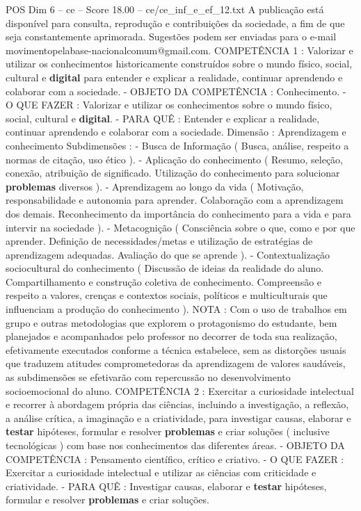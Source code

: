 \begin{textsample}{POS Dim 6 – ce – Score 18.00 – ce/ce\_inf\_e\_ef\_12.txt}
A publicação está disponível para consulta, reprodução e contribuições da sociedade, a fim de que seja constantemente aprimorada.
Sugestões podem ser enviadas para o e-mail movimentopelabase-nacionalcomum@gmail.com.
COMPETÊNCIA 1 : Valorizar e utilizar os conhecimentos historicamente construídos sobre o mundo físico, social, cultural e \textbf{digital} para entender e explicar a realidade, continuar aprendendo e colaborar com a sociedade. - OBJETO DA COMPETÊNCIA : Conhecimento. - O QUE FAZER : Valorizar e utilizar os conhecimentos sobre o mundo físico, social, cultural e \textbf{digital}. - PARA QUÊ : Entender e explicar a realidade, continuar aprendendo e colaborar com a sociedade.
Dimensão : Aprendizagem e conhecimento Subdimensões : - Busca de Informação ( Busca, análise, respeito a normas de citação, uso ético ). - Aplicação do conhecimento ( Resumo, seleção, conexão, atribuição de significado.
Utilização do conhecimento para solucionar \textbf{problemas} diversos ). - Aprendizagem ao longo da vida ( Motivação, responsabilidade e autonomia para aprender.
Colaboração com a aprendizagem dos demais.
Reconhecimento da importância do conhecimento para a vida e para intervir na sociedade ). - Metacognição ( Consciência sobre o que, como e por que aprender.
Definição de necessidades/metas e utilização de estratégias de aprendizagem adequadas.
Avaliação do que se aprende ). - Contextualização sociocultural do conhecimento ( Discussão de ideias da realidade do aluno.
Compartilhamento e construção coletiva de conhecimento.
Compreensão e respeito a valores, crenças e contextos sociais, políticos e multiculturais que influenciam a produção do conhecimento ).
NOTA : Com o uso de trabalhos em grupo e outras metodologias que explorem o protagonismo do estudante, bem planejados e acompanhados pelo professor no decorrer de toda sua realização, efetivamente executados conforme a técnica estabelece, sem as distorções usuais que traduzem atitudes comprometedoras da aprendizagem de valores saudáveis, as subdimensões se efetivarão com repercussão no desenvolvimento socioemocional do aluno.
COMPETÊNCIA 2 : Exercitar a curiosidade intelectual e recorrer à abordagem própria das ciências, incluindo a investigação, a reflexão, a análise crítica, a imaginação e a criatividade, para investigar causas, elaborar e \textbf{testar} hipóteses, formular e resolver \textbf{problemas} e criar soluções ( inclusive tecnológicas ) com base nos conhecimentos das diferentes áreas. - OBJETO DA COMPETÊNCIA : Pensamento científico, crítico e criativo. - O QUE FAZER : Exercitar a curiosidade intelectual e utilizar as ciências com criticidade e criatividade. - PARA QUÊ : Investigar causas, elaborar e \textbf{testar} hipóteses, formular e resolver \textbf{problemas} e criar soluções.

\end{textsample}
